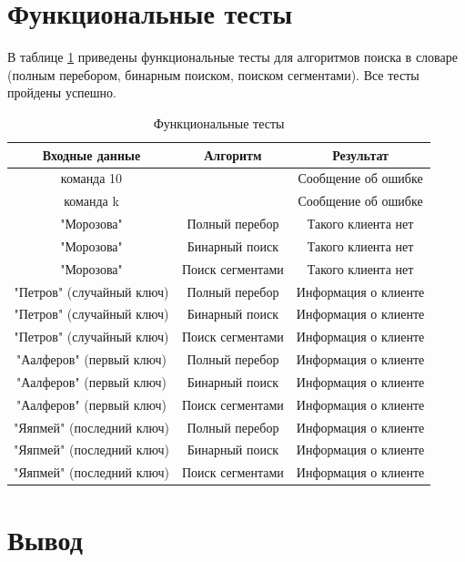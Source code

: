 \documentclass[a4paper,14pt, unknownkeysallowed]{extreport}
\begin{document}
\clearpage

\section{Функциональные тесты}

В таблице \ref{tbl:functional_test} приведены функциональные тесты для алгоритмов поиска в словаре (полным перебором, бинарным поиском, поиском сегментами). Все тесты пройдены успешно.

\begin{center}
\captionsetup{justification=raggedright,singlelinecheck=off}
\begin{longtable}[c]{|c|c|c|}
\caption{Функциональные тесты\label{tbl:functional_test}}
	\\ \hline
	Входные данные & Алгоритм & Результат 
	\\ \hline
	команда 10 &  & Сообщение об ошибке
	\\ \hline
	команда k &  & Сообщение об ошибке
	\\ \hline
	"Морозова" & Полный перебор & Такого клиента нет
	\\ \hline
	"Морозова" & Бинарный поиск & Такого клиента нет
	\\ \hline
	"Морозова" & Поиск сегментами & Такого клиента нет
	\\ \hline
	"Петров" (случайный ключ) & Полный перебор & Информация о клиенте
	\\ \hline
	"Петров" (случайный ключ) & Бинарный поиск & Информация о клиенте
	\\ \hline
	"Петров" (случайный ключ) & Поиск сегментами & Информация о клиенте
	\\ \hline
	"Аалферов" (первый ключ) & Полный перебор & Информация о клиенте
	\\ \hline
	"Аалферов" (первый ключ) & Бинарный поиск & Информация о клиенте
	\\ \hline
	"Аалферов" (первый ключ) & Поиск сегментами & Информация о клиенте
	\\ \hline
	"Яяпмей" (последний ключ) & Полный перебор & Информация о клиенте
	\\ \hline
	"Яяпмей" (последний ключ) & Бинарный поиск & Информация о клиенте
	\\ \hline
	"Яяпмей" (последний ключ) & Поиск сегментами & Информация о клиенте
	\\ \hline
\end{longtable}
\end{center}

\section{Вывод}
\end{document}
